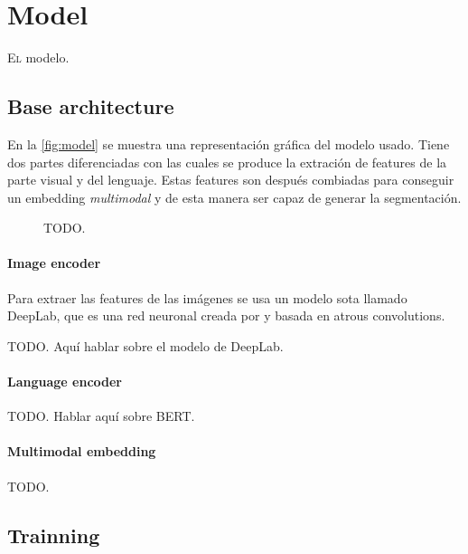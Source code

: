 

\chapter{Model} \label{cha:model}



\lettrine{E}{l} modelo.


\section{Base architecture}

En la \vref{fig:model} se muestra una representación gráfica del modelo
usado. Tiene dos partes diferenciadas con las cuales se produce la extración de
features de la parte visual y del lenguaje. Estas features son después
combiadas para conseguir un embedding \emph{multimodal} y de esta manera ser
capaz de generar la segmentación.

\begin{figure}[ht]
  \centering
  \caption{TODO.}
  \label{fig:model}
\end{figure}

\subsubsection{Image encoder}
Para extraer las features de las imágenes se usa un modelo \gls{sota} llamado
DeepLab, que es una red neuronal creada por  y basada en
atrous convolutions.

TODO. Aquí hablar sobre el modelo de DeepLab.


\subsubsection{Language encoder}
TODO. Hablar aquí sobre BERT.

\subsubsection{Multimodal embedding}
TODO.


\section{Trainning}

